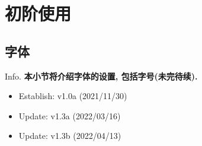 \documentclass[hyperref, UTF8, CJK, aspectratio=169]{beamer}
\begin{document}


\section{初阶使用}
\subsection{字体}
\begin{frame}{Info.}
	\textbf{本小节将介绍字体的设置, 包括字号(未完待续).}
	\begin{multicols}{2}
		\begin{itemize}
			\item Establish: \textcolor{scugreen}{v1.0a (2021/11/30)}
			\item Update: \textcolor{scugreen}{v1.3a (2022/03/16)}
      \item Update: \textcolor{scugreen}{v1.3b (2022/04/13)}
		\end{itemize}
	\end{multicols}
	\mycopyright
\end{frame}
\end{document}

